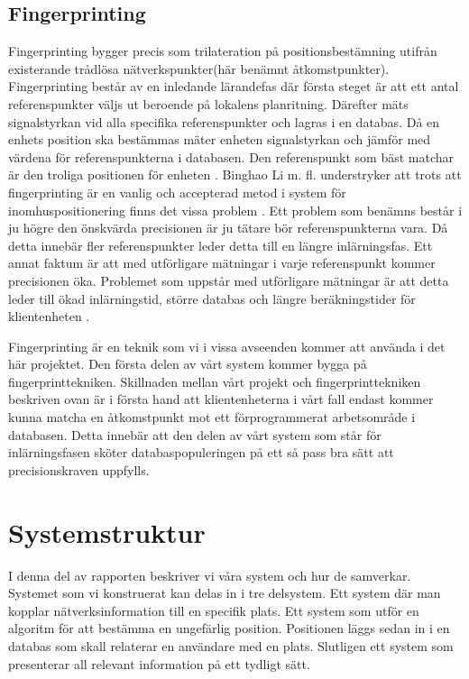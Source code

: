 \documentclass[swedish, a4paper,12pt]{article}
\begin{document}
\subsection{Fingerprinting}
Fingerprinting bygger precis som trilateration på positionsbestämning utifrån existerande trådlösa nätverkspunkter(här benämnt åtkomstpunkter). Fingerprinting består av en inledande lärandefas där första steget är att ett antal referenspunkter väljs ut beroende på lokalens planritning. Därefter mäts signalstyrkan vid alla specifika referenspunkter och lagras i en databas.%
Då en enhets position ska bestämmas mäter enheten signalstyrkan och jämför med värdena för referenspunkterna i databasen. Den referenspunkt som bäst matchar är den troliga positionen för enheten \cite{IP1}\cite{jun2018low}.
Binghao Li m. fl. understryker att trots att fingerprinting är en vanlig och accepterad metod i system för inomhuspositionering finns det vissa problem \cite{IP1}.
Ett problem som benämns består i ju högre den önskvärda precisionen är ju tätare bör referenspunkterna vara. Då detta innebär fler referenspunkter leder detta till en längre inlärningsfas. Ett annat faktum är att med utförligare mätningar i varje referenspunkt kommer precisionen öka. Problemet som uppstår med utförligare mätningar är att detta leder till ökad inlärningstid, större databas och längre beräkningstider för klientenheten \cite{IP1}.

Fingerprinting är en teknik som vi i vissa avseenden kommer att använda i det här projektet. Den första delen av vårt system kommer bygga på fingerprinttekniken. Skillnaden mellan vårt projekt och fingerprinttekniken beskriven ovan är i första hand att klientenheterna i vårt fall endast kommer kunna matcha en åtkomstpunkt mot ett förprogrammerat arbetsområde i databasen. Detta innebär att den delen av vårt system som står för inlärningsfasen sköter databaspopuleringen på ett så pass bra sätt att precisionskraven uppfylls.
\fi
\section{Systemstruktur}
I denna del av rapporten beskriver vi våra system och hur de samverkar.
Systemet som vi konstruerat kan delas in i tre delsystem. Ett system där man kopplar nätverksinformation till en specifik plats. Ett system som utför en algoritm för att bestämma en ungefärlig position. Positionen läggs sedan in i en databas som skall relaterar en användare med en plats. Slutligen ett system som presenterar all relevant information på ett tydligt sätt.
\end{document}
